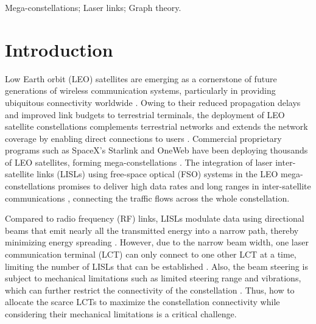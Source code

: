 \documentclass[journal]{IEEEtran}
\begin{document}
\begin{IEEEkeywords} 
Mega-constellations; Laser links; Graph theory.
\end{IEEEkeywords}


\section{Introduction}
Low Earth orbit (LEO) satellites are emerging as a cornerstone of future generations of wireless communication systems, particularly in providing ubiquitous connectivity worldwide \cite{maiolinicapez2024use}.
Owing to their reduced propagation delays and improved link budgets to terrestrial terminals, the deployment of LEO satellite constellations complements terrestrial networks and extends the network coverage by enabling direct connections to users \cite{he2024directtosmartphone}.
Commercial proprietary programs such as SpaceX’s Starlink and OneWeb have been deploying thousands of LEO satellites, forming mega-constellations \cite{wu2025enhancing}.
The integration of laser inter-satellite links (LISLs) using free-space optical (FSO) systems in the LEO mega-constellations promises to deliver high data rates and long ranges in inter-satellite communications \cite{elamassie2023freea}, connecting the traffic flows across the whole constellation.

Compared to radio frequency (RF) links, LISLs modulate data using directional beams that emit nearly all the transmitted energy into a narrow path, thereby minimizing energy spreading \cite{ntontin2025vision}. 
However, due to the narrow beam width, one laser communication terminal (LCT) can only connect to one other LCT at a time, limiting the number of LISLs that can be established \cite{wang2024free}. 
Also, the beam steering is subject to mechanical limitations such as limited steering range and vibrations, which can further restrict the connectivity of the constellation \cite{kaymak2018survey}.
Thus, how to allocate the scarce LCTs to maximize the constellation connectivity while considering their mechanical limitations is a critical challenge.
\end{document}
